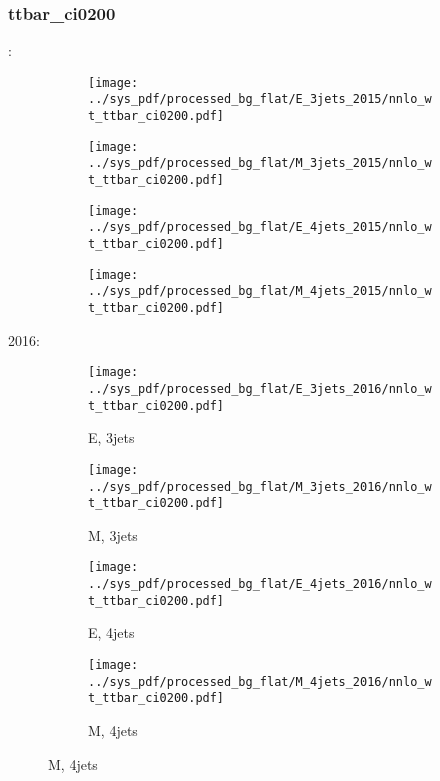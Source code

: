 \documentclass{beamer}
\begin{document}
\begin{frame}
\frametitle{ttbar_ci0200}
\fontsize{5}{1}:
\begin{figure}
\centering
\begin{subfigure}[b]{0.24\textwidth}
\texttt{[image: ../sys\_pdf/processed\_bg\_flat/E\_3jets\_2015/nnlo\_wt\_ttbar\_ci0200.pdf]}
\end{subfigure}
\begin{subfigure}[b]{0.24\textwidth}
\texttt{[image: ../sys\_pdf/processed\_bg\_flat/M\_3jets\_2015/nnlo\_wt\_ttbar\_ci0200.pdf]}
\end{subfigure}
\begin{subfigure}[b]{0.24\textwidth}
\texttt{[image: ../sys\_pdf/processed\_bg\_flat/E\_4jets\_2015/nnlo\_wt\_ttbar\_ci0200.pdf]}
\end{subfigure}
\begin{subfigure}[b]{0.24\textwidth}
\texttt{[image: ../sys\_pdf/processed\_bg\_flat/M\_4jets\_2015/nnlo\_wt\_ttbar\_ci0200.pdf]}
\end{subfigure}
\end{figure}
2016:
\begin{figure}
\centering
\begin{subfigure}[b]{0.24\textwidth}
\texttt{[image: ../sys\_pdf/processed\_bg\_flat/E\_3jets\_2016/nnlo\_wt\_ttbar\_ci0200.pdf]}
\captionsetup{font=tiny}
\caption{E, 3jets}
\end{subfigure}
\begin{subfigure}[b]{0.24\textwidth}
\texttt{[image: ../sys\_pdf/processed\_bg\_flat/M\_3jets\_2016/nnlo\_wt\_ttbar\_ci0200.pdf]}
\captionsetup{font=tiny}
\caption{M, 3jets}
\end{subfigure}
\begin{subfigure}[b]{0.24\textwidth}
\texttt{[image: ../sys\_pdf/processed\_bg\_flat/E\_4jets\_2016/nnlo\_wt\_ttbar\_ci0200.pdf]}
\captionsetup{font=tiny}
\caption{E, 4jets}
\end{subfigure}
\begin{subfigure}[b]{0.24\textwidth}
\texttt{[image: ../sys\_pdf/processed\_bg\_flat/M\_4jets\_2016/nnlo\_wt\_ttbar\_ci0200.pdf]}
\captionsetup{font=tiny}
\caption{M, 4jets}
\end{subfigure}
\end{figure}
\end{frame}
\end{document}
